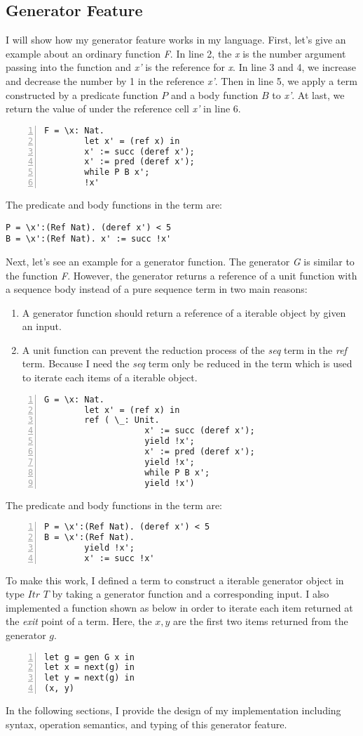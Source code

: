 \subsection{Generator Feature}
I will show how my generator feature works in my language. First, let's give an example about an ordinary function \textit{F}. In line 2, the \textit{x} is the number argument passing into the function and \textit{x'} is the reference for \textit{x}. In line 3 and 4, we increase and decrease the number by 1 in the reference \textit{x'}. Then in line 5, we apply a \while term constructed by a predicate function $P$ and a body function $B$ to \textit{x'}. At last, we return the value of under the reference cell \textit{x'} in line 6.
\begin{lstlisting}[basicstyle=\small, numbers=left]
F = \x: Nat.
		let x' = (ref x) in 
		x' := succ (deref x');
		x' := pred (deref x');
		while P B x';
		!x'
\end{lstlisting}
The predicate and body functions in the \while term are: 
\begin{lstlisting}[basicstyle=\small]
P = \x':(Ref Nat). (deref x') < 5
B = \x':(Ref Nat). x' := succ !x'
\end{lstlisting}
Next, let's see an example for a generator function. The generator \textit{G} is similar to the function \textit{F}. However, the generator returns a reference of a unit function with a sequence body instead of a pure sequence term in two main reasons:
\begin{enumerate}
	\item A generator function should return a reference of a iterable object by given an input.
	\item A unit function can prevent the reduction process of the \textit{seq} term in the \textit{ref} term. Because I need the \textit{seq} term only be reduced in the \nt term which is used to iterate each items of a iterable object. 
\end{enumerate}
\begin{lstlisting}[basicstyle=\small, numbers=left]
G = \x: Nat.
		let x' = (ref x) in 
		ref ( \_: Unit.
					x' := succ (deref x');
					yield !x';
					x' := pred (deref x');
					yield !x';
					while P B x';
					yield !x')
\end{lstlisting}
The predicate and body functions in the \while term are:
\begin{lstlisting}[basicstyle=\small, numbers=left]
P = \x':(Ref Nat). (deref x') < 5
B = \x':(Ref Nat). 
		yield !x'; 
		x' := succ !x'
\end{lstlisting}
To make this work, I defined a \gen term to construct a iterable generator object in type $Itr$ $T$ by taking a generator function and a corresponding input. 
I also implemented a \nt function shown as below in order to iterate each item returned at the \textit{exit} point of a \gen term. 
Here, the $x, y$ are the first two items returned from the generator $g$.
\begin{lstlisting}[basicstyle=\small, numbers=left]
let g = gen G x in 
let x = next(g) in
let y = next(g) in
(x, y)
\end{lstlisting}
In the following sections, I provide the design of my implementation including syntax, operation semantics, and typing of this generator feature. 